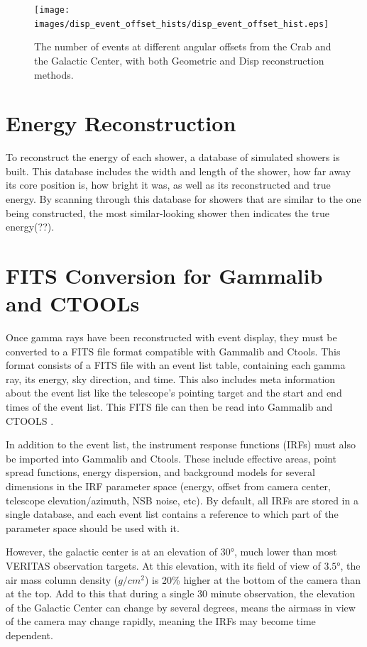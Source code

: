 \begin{figure}[ht]
  \begin{center}
    \texttt{[image: images/disp\_event\_offset\_hists/disp\_event\_offset\_hist.eps]}
    \caption[DISP Offset Improvement]{The number of events at different angular offsets from the Crab and the Galactic Center, with both Geometric and Disp reconstruction methods.}\label{fig:disp_event_offset}
  \end{center}
\end{figure}


\section{Energy Reconstruction}\label{subsec:enrecon}
To reconstruct the energy of each shower, a database of simulated showers is built.
This database includes the width and length of the shower, how far away its core position is, how bright it was, as well as its reconstructed and true energy.
By scanning through this database for showers that are similar to the one being constructed, the most similar-looking shower then indicates the true energy(??).



\section{FITS Conversion for Gammalib and CTOOLs}

Once gamma rays have been reconstructed with event display, they must be converted to a FITS file format compatible with Gammalib and Ctools.
This format consists of a FITS file with an event list table, containing each gamma ray, its energy, sky direction, and time.
This also includes meta information about the event list like the telescope's pointing target and the start and end times of the event list.
This FITS file can then be read into Gammalib and CTOOLS \cite{gammalibctools}.

In addition to the event list, the instrument response functions (IRFs) must also be imported into Gammalib and Ctools.
These include effective areas, point spread functions, energy dispersion, and background models for several dimensions in the IRF parameter space (energy, offset from camera center, telescope elevation/azimuth, NSB noise, etc).
By default, all IRFs are stored in a single database, and each event list contains a reference to which part of the parameter space should be used with it.

However, the galactic center is at an elevation of $\ang{30}$, much lower than most VERITAS observation targets.
At this elevation, with its field of view of $\ang{3.5}$, the air mass column density ($g/cm^{2}$) is 20\% higher at the bottom of the camera than at the top.
Add to this that during a single 30 minute observation, the elevation of the Galactic Center can change by several degrees, means the airmass in view of the camera may change rapidly, meaning the IRFs may become time dependent.

